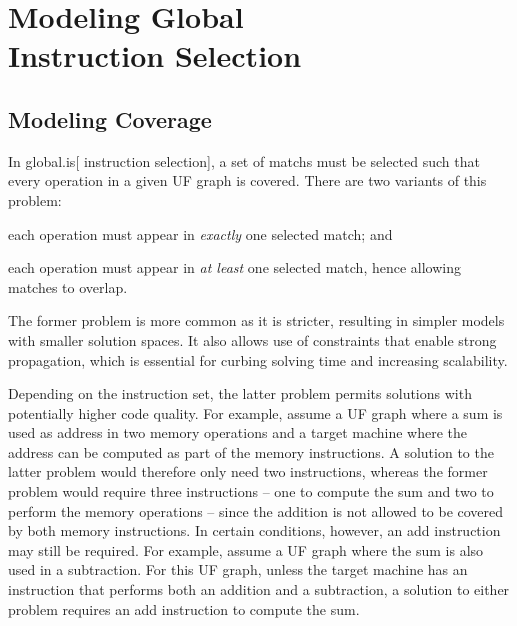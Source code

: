 %

\chapter[Modeling Global Instruction Selection]
        {Modeling Global\\ Instruction Selection}



\section{Modeling Coverage}

In \gls{global.is}[ \gls{instruction selection}], a set of \glspl{match} must be
selected such that every \gls{operation} in a given \gls{UF graph} is covered.
%
There are two variants of this problem:
%
\begin{enumerate*}[label=(\arabic*)]
  \item each \gls{operation} must appear in \emph{exactly} one selected
    \gls{match}; and
%
  \item each \gls{operation} must appear in \emph{at least} one selected
    \gls{match}, hence allowing matches to \gls{overlap}.
\end{enumerate*}
%
The former problem is more common as it is stricter, resulting in simpler models
with smaller \glspl{solution space}.
%
It also allows use of \glspl{constraint} that enable strong \gls{propagation},
which is essential for curbing solving time and increasing scalability.

Depending on the \gls{instruction set}, the latter problem permits
\glspl{solution} with potentially higher code quality.
%
For example, assume a \gls{UF graph} where a sum is used as address in two
memory operations and a \gls{target machine} where the address can be computed
as part of the memory instructions.
%
A \gls{solution} to the latter problem would therefore only need two
instructions, whereas the former problem would require three instructions -- one
to compute the sum and two to perform the memory operations -- since the
addition is not allowed to be covered by both memory instructions.
%
In certain conditions, however, an add instruction may still be required.
%
For example, assume a \gls{UF graph} where the sum is also used in a
subtraction.
%
For this \gls{UF graph}, unless the \gls{target machine} has an instruction that
performs both an addition and a subtraction, a \gls{solution} to either problem
requires an add instruction to compute the sum.


